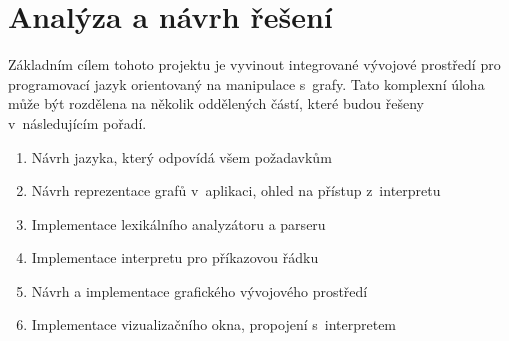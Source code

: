 \documentclass[11pt,twoside,a4paper]{book}
\begin{document}
%
%



\chapter{Analýza a návrh řešení}


Základním cílem tohoto projektu je vyvinout integrované vývojové prostředí pro programovací jazyk orientovaný na manipulace s~grafy. Tato komplexní úloha může být rozdělena na několik oddělených částí, které budou řešeny v~následujícím pořadí.

\begin{enumerate}
\item Návrh jazyka, který odpovídá všem požadavkům
\item Návrh reprezentace grafů v~aplikaci, ohled na přístup z~interpretu
\item Implementace lexikálního analyzátoru a parseru
\item Implementace interpretu pro příkazovou řádku
\item Návrh a implementace grafického vývojového prostředí
\item Implementace vizualizačního okna, propojení s~interpretem
\end{enumerate}
\end{document}
